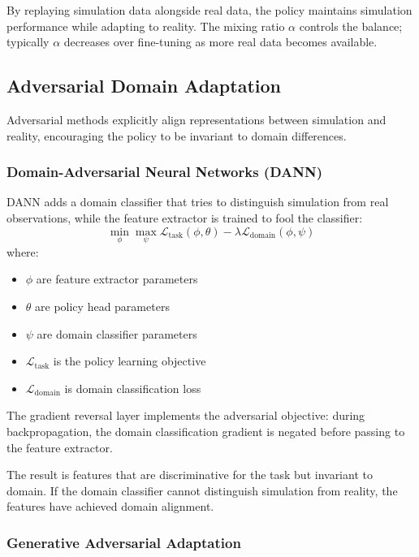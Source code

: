 By replaying simulation data alongside real data, the policy maintains simulation performance while adapting to reality. The mixing ratio $\alpha$ controls the balance; typically $\alpha$ decreases over fine-tuning as more real data becomes available.

\subsection{Adversarial Domain Adaptation}

Adversarial methods explicitly align representations between simulation and reality, encouraging the policy to be invariant to domain differences.

\subsubsection{Domain-Adversarial Neural Networks (DANN)}

DANN adds a domain classifier that tries to distinguish simulation from real observations, while the feature extractor is trained to fool the classifier:
\begin{equation}
\min_\phi \max_\psi \mathcal{L}_{\text{task}}(\phi, \theta) - \lambda \mathcal{L}_{\text{domain}}(\phi, \psi)
\label{eq:dann_objective}
\end{equation}
where:
\begin{itemize}
    \item $\phi$ are feature extractor parameters
    \item $\theta$ are policy head parameters
    \item $\psi$ are domain classifier parameters
    \item $\mathcal{L}_{\text{task}}$ is the policy learning objective
    \item $\mathcal{L}_{\text{domain}}$ is domain classification loss
\end{itemize}

The gradient reversal layer implements the adversarial objective: during backpropagation, the domain classification gradient is negated before passing to the feature extractor.

The result is features that are discriminative for the task but invariant to domain. If the domain classifier cannot distinguish simulation from reality, the features have achieved domain alignment.

\subsubsection{Generative Adversarial Adaptation}


